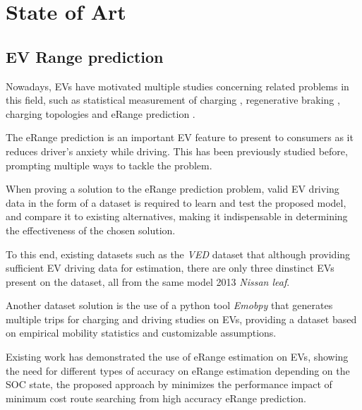 \chapter{State of Art}
\label{cha:stateOfArt}

\section{EV Range prediction} 
\label{sec:stateOfArtER}

Nowadays, \glspl{EV} have motivated multiple studies
concerning related problems in this field,
such as statistical measurement of charging \citep{EVScout2},
regenerative braking \citep{regenerativeBraking},
charging topologies \citep{batteryChargerTopologies} 
and \gls{eRange} prediction \citep{predictionOfeRange}.

The \gls{eRange} prediction is an important 
\gls{EV} feature to present to consumers as
it reduces driver's anxiety while driving.
This has been previously studied before,
prompting multiple ways to tackle the problem.

When proving a solution to the \gls{eRange}
prediction problem, valid \gls{EV} driving data 
in the form of a \gls{dataset} is required to 
learn and test the proposed model,
and compare it to existing alternatives, 
making it indispensable in determining the
effectiveness of the chosen solution.

To this end, existing \glspl{dataset}
such as the \textit{VED} \gls{dataset} \citep{vedDataset}
that although providing sufficient \gls{EV} driving
data for estimation, there are only three dinstinct 
\glspl{EV} present on the \gls{dataset}, all from the 
same model 2013 \textit{Nissan leaf}.


Another \gls{dataset} solution is the use of 
a \gls{python} tool \textit{Emobpy} \citep{emobpy}
that generates multiple trips for charging and driving
studies on \glspl{EV}, providing a \gls{dataset}
based on empirical mobility statistics and 
customizable assumptions.


Existing work has demonstrated the use of
\gls{eRange} estimation on \glspl{EV}, 
showing the need for different types 
of accuracy on \gls{eRange}
estimation depending on the \gls{SOC} state,
the proposed approach by \citep{eRange}
minimizes the performance impact
of minimum cost route searching from high accuracy
\gls{eRange} prediction.

